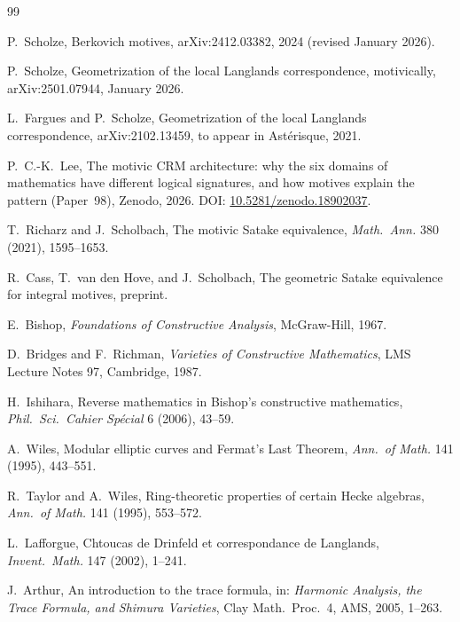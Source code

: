 \documentclass[11pt,a4paper]{article}
\theoremstyle{plain}
\theoremstyle{definition}
\begin{document}
\begin{thebibliography}{99}

 P.\ Scholze, Berkovich motives, arXiv:2412.03382, 2024 (revised January 2026).

 P.\ Scholze, Geometrization of the local Langlands correspondence, motivically, arXiv:2501.07944, January 2026.

 L.\ Fargues and P.\ Scholze, Geometrization of the local Langlands correspondence, arXiv:2102.13459, to appear in Ast\'erisque, 2021.

 P.\ C.-K.\ Lee, The motivic CRM architecture: why the six domains of mathematics have different logical signatures, and how motives explain the pattern (Paper~98), Zenodo, 2026. DOI: \href{https://doi.org/10.5281/zenodo.18902037}{10.5281/zenodo.18902037}.

 T.\ Richarz and J.\ Scholbach, The motivic Satake equivalence, \emph{Math.\ Ann.} 380 (2021), 1595--1653.

 R.\ Cass, T.\ van den Hove, and J.\ Scholbach, The geometric Satake equivalence for integral motives, preprint.

 E.\ Bishop, \emph{Foundations of Constructive Analysis}, McGraw-Hill, 1967.

 D.\ Bridges and F.\ Richman, \emph{Varieties of Constructive Mathematics}, LMS Lecture Notes 97, Cambridge, 1987.

 H.\ Ishihara, Reverse mathematics in Bishop's constructive mathematics, \emph{Phil.\ Sci.\ Cahier Sp\'ecial} 6 (2006), 43--59.

 A.\ Wiles, Modular elliptic curves and Fermat's Last Theorem, \emph{Ann.\ of Math.} 141 (1995), 443--551.

 R.\ Taylor and A.\ Wiles, Ring-theoretic properties of certain Hecke algebras, \emph{Ann.\ of Math.} 141 (1995), 553--572.

 L.\ Lafforgue, Chtoucas de Drinfeld et correspondance de Langlands, \emph{Invent.\ Math.} 147 (2002), 1--241.

 J.\ Arthur, An introduction to the trace formula, in: \emph{Harmonic Analysis, the Trace Formula, and Shimura Varieties}, Clay Math.\ Proc.\ 4, AMS, 2005, 1--263.


\end{thebibliography}
\end{document}
